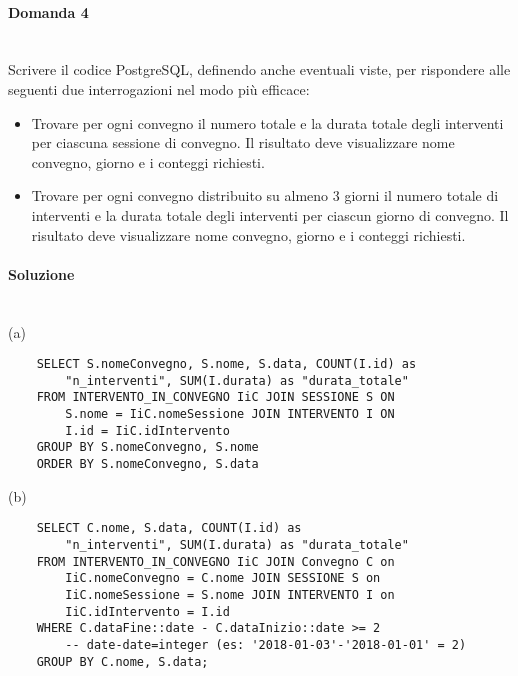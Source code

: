 \documentclass[a4paper, 10pt, titlepage]{article}
\begin{document}
\paragraph{Domanda 4}\dotfill
\\Scrivere il codice PostgreSQL, definendo anche eventuali viste, per rispondere alle seguenti due interrogazioni nel modo più efficace:
\begin{itemize}
\item[(a)] Trovare per ogni convegno il numero totale e la durata totale degli interventi per ciascuna sessione di convegno. Il risultato deve visualizzare nome convegno, giorno e i conteggi richiesti.
\item[(b)] Trovare per ogni convegno distribuito su almeno 3 giorni il numero totale di interventi e la durata totale degli interventi per ciascun giorno di convegno. Il risultato deve visualizzare nome convegno, giorno e i conteggi richiesti.
\end{itemize}

\paragraph{Soluzione}\dotfill
\\(a)
\lstset{language=SQL}
\begin{lstlisting}
	SELECT S.nomeConvegno, S.nome, S.data, COUNT(I.id) as 
		"n_interventi", SUM(I.durata) as "durata_totale"
	FROM INTERVENTO_IN_CONVEGNO IiC JOIN SESSIONE S ON
		S.nome = IiC.nomeSessione JOIN INTERVENTO I ON
		I.id = IiC.idIntervento
	GROUP BY S.nomeConvegno, S.nome
	ORDER BY S.nomeConvegno, S.data
\end{lstlisting}
(b)
\begin{lstlisting}
	SELECT C.nome, S.data, COUNT(I.id) as
		"n_interventi", SUM(I.durata) as "durata_totale"
	FROM INTERVENTO_IN_CONVEGNO IiC JOIN Convegno C on
  		IiC.nomeConvegno = C.nome JOIN SESSIONE S on
  		IiC.nomeSessione = S.nome JOIN INTERVENTO I on
  		IiC.idIntervento = I.id
	WHERE C.dataFine::date - C.dataInizio::date >= 2
		-- date-date=integer (es: '2018-01-03'-'2018-01-01' = 2)
	GROUP BY C.nome, S.data;
\end{lstlisting}
\end{document}
